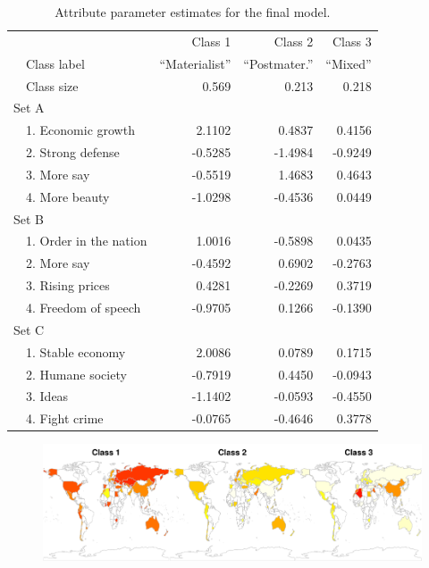 \documentclass[letterpaper,12pt]{article}
\begin{document}
\begin{table}\centering
	\begin{tabular}{llrrr}
	\hline
			&&	Class 1	&	Class 2	&	Class 3\\
			&Class label& ``Materialist'' & ``Postmater.'' & ``Mixed''\\
& Class size & 0.569 & 0.213 & 0.218\\
				\hline
\multicolumn{3}{l}{Set A}\\
& 1. Economic growth	&	2.1102	&	0.4837	&	0.4156\\
& 2. Strong defense	&	-0.5285	&	-1.4984	&	-0.9249\\
& 3. More say	&	-0.5519	&	1.4683	&	0.4643\\
& 4. More beauty	&	-1.0298	&	-0.4536	&	0.0449\\
\multicolumn{3}{l}{Set B}\\
& 1. Order in the nation	&	1.0016	&	-0.5898	&	0.0435\\
& 2. More say	&	-0.4592	&	0.6902	&	-0.2763\\
& 3. Rising prices	&	0.4281	&	-0.2269	&	0.3719\\
& 4. Freedom of speech	&	-0.9705	&	0.1266	&	-0.1390\\
\multicolumn{3}{l}{Set C}\\
& 1. Stable economy	&	2.0086	&	0.0789	&	0.1715\\
& 2. Humane society	&	-0.7919	&	0.4450	&	-0.0943\\
& 3. Ideas	&	-1.1402	&	-0.0593	&	-0.4550\\
& 4. Fight crime	&	-0.0765	&	-0.4646	&	0.3778\\
	\hline
	\end{tabular}
	\caption{\label{tab:attribute-parameters}Attribute parameter estimates for the 
		final model.}

\end{table}



\begin{figure}
	\includegraphics[width=\textwidth]{figures/maps.pdf}
	
	\caption{\label{fig:maps}}
\end{figure}
\end{document}
